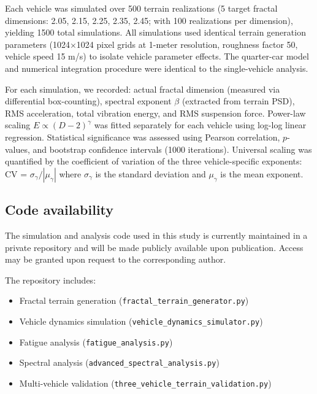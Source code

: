 \documentclass[11pt,letterpaper]{article}
\begin{document}
Each vehicle was simulated over 500 terrain realizations (5 target fractal dimensions: 2.05, 2.15, 2.25, 2.35, 2.45; with 100 realizations per dimension), yielding 1500 total simulations. All simulations used identical terrain generation parameters (1024$\times$1024 pixel grids at 1-meter resolution, roughness factor 50, vehicle speed 15 m/s) to isolate vehicle parameter effects. The quarter-car model and numerical integration procedure were identical to the single-vehicle analysis.

For each simulation, we recorded: actual fractal dimension (measured via differential box-counting), spectral exponent $\beta$ (extracted from terrain PSD), RMS acceleration, total vibration energy, and RMS suspension force. Power-law scaling $E \propto (D-2)^\gamma$ was fitted separately for each vehicle using log-log linear regression. Statistical significance was assessed using Pearson correlation, $p$-values, and bootstrap confidence intervals (1000 iterations). Universal scaling was quantified by the coefficient of variation of the three vehicle-specific exponents: CV = $\sigma_\gamma / |\mu_\gamma|$ where $\sigma_\gamma$ is the standard deviation and $\mu_\gamma$ is the mean exponent.

\subsection{Code availability}

The simulation and analysis code used in this study is currently maintained in a private repository and will be made publicly available upon publication. Access may be granted upon request to the corresponding author. 

The repository includes: 
\begin{itemize}
\item Fractal terrain generation (\texttt{fractal\_\allowbreak terrain\_\allowbreak generator.py})
\item Vehicle dynamics simulation (\texttt{vehicle\_\allowbreak dynamics\_\allowbreak simulator.py})
\item Fatigue analysis (\texttt{fatigue\_\allowbreak analysis.py})
\item Spectral analysis (\texttt{advanced\_\allowbreak spectral\_\allowbreak analysis.py})
\item Multi-vehicle validation (\texttt{three\_\allowbreak vehicle\_\allowbreak terrain\_\allowbreak validation.py})
\end{itemize}
\end{document}
